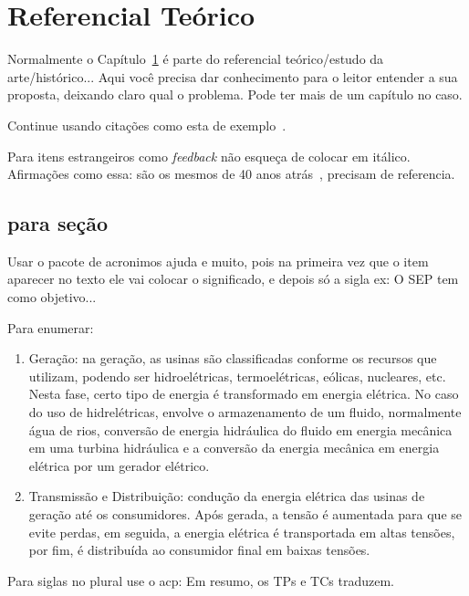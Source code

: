 \chapter{Referencial Teórico}\label{cap:XX}

Normalmente o Capítulo~\ref{cap:XX} é parte do referencial teórico/estudo da arte/histórico... Aqui você precisa dar conhecimento para o leitor entender a sua proposta, deixando claro qual o problema. Pode ter mais de um capítulo no caso.


Continue usando citações como esta de exemplo~\cite{fangxing2010,gungor2011}.

Para itens estrangeiros como \textit{feedback}  não esqueça de colocar em itálico. Afirmações como essa: são os mesmos de 40 anos atrás~\cite{gungor2011}, precisam de referencia. 

\section{para seção}\label{sec:XX} %

Usar o pacote de acronimos ajuda e muito, pois na primeira vez que o item aparecer no texto ele vai colocar o significado, e depois só a sigla ex: O \ac{SEP} tem como objetivo...

Para enumerar:

\begin{enumerate}
\item Geração: 
na geração, as usinas são classificadas conforme os recursos que utilizam, podendo ser hidroelétricas, termoelétricas, eólicas, nucleares, etc. Nesta fase, certo tipo de energia é transformado em energia elétrica. %
No caso do uso de hidrelétricas, envolve o armazenamento de um fluido, normalmente água de rios, conversão de energia hidráulica do fluido em energia mecânica em uma turbina hidráulica e a conversão da energia mecânica em energia elétrica por um gerador elétrico. 
\item Transmissão e Distribuição:
condução da energia elétrica das usinas de geração até os consumidores. Após gerada, a tensão é aumentada para que se evite perdas, em seguida, a energia elétrica é transportada em altas tensões, por fim, é distribuída ao consumidor final em baixas tensões. 
\end{enumerate}

Para siglas no plural use o acp: Em resumo, os \acp{TP} e \acp{TC} traduzem. 

